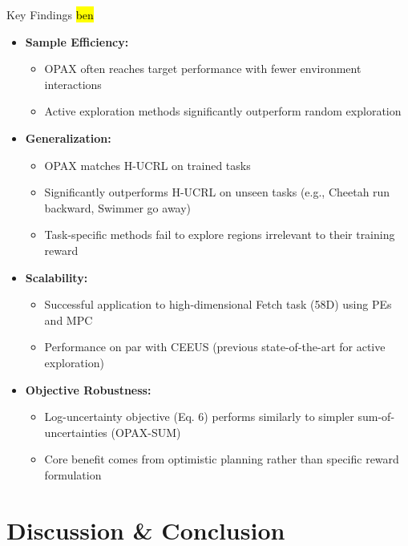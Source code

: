 \documentclass[11pt,aspectratio=169]{beamer}
\begin{document}
\begin{frame}{Key Findings \hl{ben}}
    \begin{itemize}
        \item \textbf{Sample Efficiency:}
        \begin{itemize}
            \item OPAX often reaches target performance with fewer environment interactions
            \item Active exploration methods significantly outperform random exploration
        \end{itemize}
        \pause
        \item \textbf{Generalization:}
        \begin{itemize}
            \item OPAX matches H-UCRL on trained tasks
            \item Significantly outperforms H-UCRL on unseen tasks (e.g., Cheetah run backward, Swimmer go away)
            \item Task-specific methods fail to explore regions irrelevant to their training reward
        \end{itemize}
        \pause
        \item \textbf{Scalability:}
        \begin{itemize}
            \item Successful application to high-dimensional Fetch task (58D) using PEs and MPC
            \item Performance on par with CEEUS (previous state-of-the-art for active exploration)
        \end{itemize}
        \pause
        \item \textbf{Objective Robustness:}
        \begin{itemize}
            \item Log-uncertainty objective (Eq. 6) performs similarly to simpler sum-of-uncertainties (OPAX-SUM)
            \item Core benefit comes from optimistic planning rather than specific reward formulation
        \end{itemize}
    \end{itemize}
\end{frame}

\section{Discussion \& Conclusion}
\end{document}
